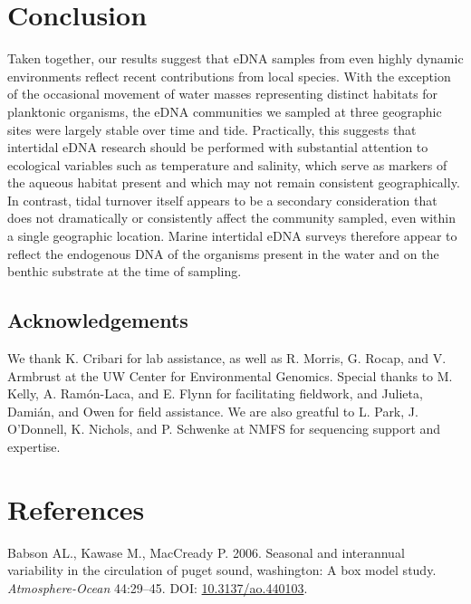 \documentclass[fleqn,10pt,lineno]{wlpeerj} %
\begin{document}
\section{Conclusion}\label{Conclusion}

Taken together, our results suggest that eDNA samples from even highly
dynamic environments reflect recent contributions from local species.
With the exception of the occasional movement of water masses
representing distinct habitats for planktonic organisms, the eDNA
communities we sampled at three geographic sites were largely stable
over time and tide. Practically, this suggests that intertidal eDNA
research should be performed with substantial attention to ecological
variables such as temperature and salinity, which serve as markers of
the aqueous habitat present and which may not remain consistent
geographically. In contrast, tidal turnover itself appears to be a
secondary consideration that does not dramatically or consistently
affect the community sampled, even within a single geographic location.
Marine intertidal eDNA surveys therefore appear to reflect the
endogenous DNA of the organisms present in the water and on the benthic
substrate at the time of sampling.

\subsection{Acknowledgements}\label{acknowledgements}

We thank K. Cribari for lab assistance, as well as R. Morris, G. Rocap,
and V. Armbrust at the UW Center for Environmental Genomics. Special
thanks to M. Kelly, A. Ramón-Laca, and E. Flynn for facilitating
fieldwork, and Julieta, Damián, and Owen for field assistance. We are
also greatful to L. Park, J. O'Donnell, K. Nichols, and P. Schwenke at
NMFS for sequencing support and expertise.

\newpage

\section*{References}\label{references}

\hypertarget{refs}{}
\hypertarget{ref-Babson2006}{}
Babson AL., Kawase M., MacCready P. 2006. Seasonal and interannual
variability in the circulation of puget sound, washington: A box model
study. \emph{Atmosphere-Ocean} 44:29--45. DOI:
\href{https://doi.org/10.3137/ao.440103}{10.3137/ao.440103}.
\end{document}
